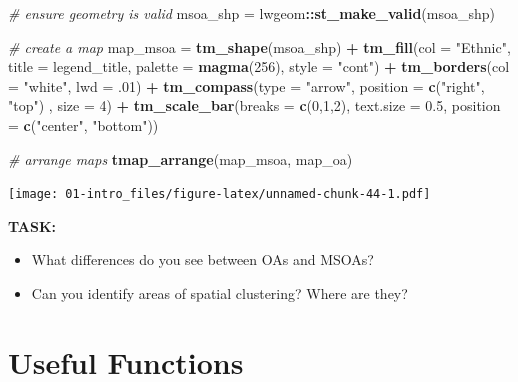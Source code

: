 \documentclass[]{book}
\newenvironment{Shaded}{\begin{snugshade}}{\end{snugshade}}
\newcommand{\KeywordTok}[1]{\textcolor[rgb]{0.13,0.29,0.53}{\textbf{#1}}}
\newcommand{\DataTypeTok}[1]{\textcolor[rgb]{0.13,0.29,0.53}{#1}}
\newcommand{\DecValTok}[1]{\textcolor[rgb]{0.00,0.00,0.81}{#1}}
\newcommand{\FloatTok}[1]{\textcolor[rgb]{0.00,0.00,0.81}{#1}}
\newcommand{\StringTok}[1]{\textcolor[rgb]{0.31,0.60,0.02}{#1}}
\newcommand{\CommentTok}[1]{\textcolor[rgb]{0.56,0.35,0.01}{\textit{#1}}}
\newcommand{\OperatorTok}[1]{\textcolor[rgb]{0.81,0.36,0.00}{\textbf{#1}}}
\newcommand{\NormalTok}[1]{#1}
\providecommand{\tightlist}{%
  \setlength{\itemsep}{0pt}\setlength{\parskip}{0pt}}
\begin{document}
\begin{Shaded}
\begin{Highlighting}[]
\CommentTok{# ensure geometry is valid}
\NormalTok{msoa_shp =}\StringTok{ }\NormalTok{lwgeom}\OperatorTok{::}\KeywordTok{st_make_valid}\NormalTok{(msoa_shp)}

\CommentTok{# create a map}
\NormalTok{map_msoa =}\StringTok{ }\KeywordTok{tm_shape}\NormalTok{(msoa_shp) }\OperatorTok{+}
\StringTok{  }\KeywordTok{tm_fill}\NormalTok{(}\DataTypeTok{col =} \StringTok{"Ethnic"}\NormalTok{, }\DataTypeTok{title =}\NormalTok{ legend_title, }\DataTypeTok{palette =} \KeywordTok{magma}\NormalTok{(}\DecValTok{256}\NormalTok{), }\DataTypeTok{style =} \StringTok{"cont"}\NormalTok{) }\OperatorTok{+}\StringTok{ }
\StringTok{  }\KeywordTok{tm_borders}\NormalTok{(}\DataTypeTok{col =} \StringTok{"white"}\NormalTok{, }\DataTypeTok{lwd =}\NormalTok{ .}\DecValTok{01}\NormalTok{)  }\OperatorTok{+}\StringTok{ }
\StringTok{  }\KeywordTok{tm_compass}\NormalTok{(}\DataTypeTok{type =} \StringTok{"arrow"}\NormalTok{, }\DataTypeTok{position =} \KeywordTok{c}\NormalTok{(}\StringTok{"right"}\NormalTok{, }\StringTok{"top"}\NormalTok{) , }\DataTypeTok{size =} \DecValTok{4}\NormalTok{) }\OperatorTok{+}\StringTok{ }
\StringTok{  }\KeywordTok{tm_scale_bar}\NormalTok{(}\DataTypeTok{breaks =} \KeywordTok{c}\NormalTok{(}\DecValTok{0}\NormalTok{,}\DecValTok{1}\NormalTok{,}\DecValTok{2}\NormalTok{), }\DataTypeTok{text.size =} \FloatTok{0.5}\NormalTok{, }\DataTypeTok{position =}  \KeywordTok{c}\NormalTok{(}\StringTok{"center"}\NormalTok{, }\StringTok{"bottom"}\NormalTok{)) }

\CommentTok{# arrange maps }
\KeywordTok{tmap_arrange}\NormalTok{(map_msoa, map_oa) }
\end{Highlighting}
\end{Shaded}

\texttt{[image: 01-intro\_files/figure-latex/unnamed-chunk-44-1.pdf]}

\textbf{TASK:}

\begin{itemize}
\tightlist
\item
  What differences do you see between OAs and MSOAs?
\item
  Can you identify areas of spatial clustering? Where are they?
\end{itemize}

\section{Useful Functions}\label{useful-functions}
\end{document}

